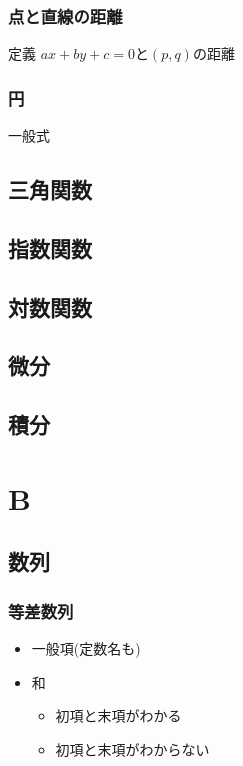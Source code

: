 \documentclass[10pt,dvipdfmx]{jsarticle}
\begin{document}
\subsubsection*{点と直線の距離}
定義 $ax+by+c=0$と$(p,q)$の距離
\vspace{10mm}

\subsubsection*{円}
一般式
\vspace{10mm}






\newpage
\subsection*{三角関数}
\subsection*{指数関数}
\subsection*{対数関数}
\subsection*{微分}
\subsection*{積分}


\newpage
\section*{B}
\subsection*{数列}
\subsubsection*{等差数列}
\begin{itemize}
  \item 一般項(定数名も)
  \item 和
        \begin{itemize}
          \item 初項と末項がわかる
          \item 初項と末項がわからない
        \end{itemize}
\end{itemize}
\end{document}
